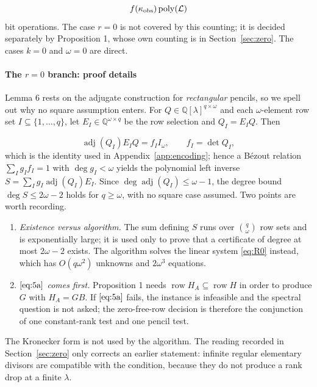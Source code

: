 \documentclass[journal]{IEEEtran}
\theoremstyle{plainn}
\theoremstyle{remark}
\begin{document}
\begin{equation}
f(\kappa_{\rm obs})\operatorname{poly}(\mathcal L)
\end{equation}
bit operations. The case $r=0$ is not covered by this counting; it is decided separately by Proposition 1, whose own counting is in Section~\ref{sec:zero}. The cases $k=0$ and $\omega=0$ are direct.

\paragraph*{The $r=0$ branch: proof details}
Lemma 6 rests on the adjugate construction for \emph{rectangular} pencils, so we spell out why no square assumption enters. For $Q\in\mathbb Q[\lambda]^{q\times\omega}$ and each $\omega$-element row set $I\subseteq\{1,\dots,q\}$, let $E_I\in\mathbb Q^{\omega\times q}$ be the row selection and $Q_I=E_IQ$. Then

\begin{equation}
\operatorname{adj}(Q_I)E_IQ=f_II_\omega,\qquad f_I=\det Q_I,
\end{equation}
which is the identity used in Appendix~\ref{app:encoding}; hence a B\'ezout relation $\sum_Ig_If_I=1$ with $\deg g_I<\omega$ yields the polynomial left inverse $S=\sum_Ig_I\operatorname{adj}(Q_I)E_I$. Since $\deg\operatorname{adj}(Q_I)\le\omega-1$, the degree bound $\deg S\le2\omega-2$ holds for $q\ge\omega$, with no square case assumed. Two points are worth recording.

\begin{enumerate}
\item \emph{Existence versus algorithm.} The sum defining $S$ runs over $\binom q\omega$ row sets and is exponentially large; it is used only to prove that a certificate of degree at most $2\omega-2$ exists. The algorithm solves the linear system \eqref{eq:R0} instead, which has $O(q\omega^2)$ unknowns and $2\omega^3$ equations.
\item \emph{$\eqref{eq:5a}$ comes first.} Proposition 1 needs $\operatorname{row}H_A\subseteq\operatorname{row}H$ in order to produce $G$ with $H_A=GB$. If $\eqref{eq:5a}$ fails, the instance is infeasible and the spectral question is not asked; the zero-free-row decision is therefore the conjunction of one constant-rank test and one pencil test.
\end{enumerate}
The Kronecker form is not used by the algorithm. The reading recorded in Section~\ref{sec:zero} only corrects an earlier statement: infinite regular elementary divisors are compatible with the condition, because they do not produce a rank drop at a finite $\lambda$.
\end{document}
